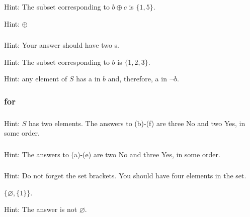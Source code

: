 \subsubsection*{ \answers}
\begin{apart}
    \item {}
    \item Hint: The subset corresponding to $b \oplus c$ is $\{1,5\}$.
    \item Hint: $\oplus$
\end{apart}

\subsubsection*{ \answers}
\begin{apart}
    \item Hint: Your answer should have two s.
    \item Hint: The subset corresponding to $b$ is $\{1,2,3\}$.
    \item Hint: any element of $S$ has a  in $b$ and, therefore, a  in $\neg b$.
\end{apart}

\subsubsection{\answers for 
\subsetsofsets}

\subsubsection*{ \answers}
Hint: $S$ has two elements. The answers to (b)-(f) are three No and two Yes, in some order.

\subsubsection*{ \answers}
Hint: The answers to (a)-(e) are two No and three Yes, in some order.

\subsubsection*{ \answers}
\begin{apart}
    \item Hint: Do not forget the set brackets.  You should have four elements in the set.
    \item $\{\varnothing, \{1\}\}$.
    \item Hint: The answer is not $\varnothing$.
\end{apart}

